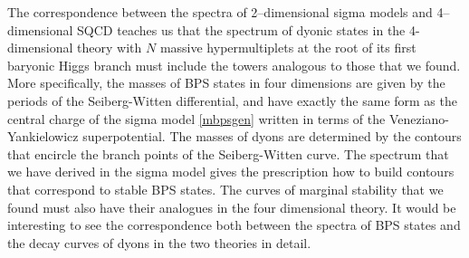 \documentclass[epsfig,12pt]{article}
\begin{document}
	The correspondence between the spectra of 2--dimensional sigma models and 4--dimensional SQCD
	teaches us that the spectrum of dyonic states in the 4-dimensional theory with $ N $ massive  
	hypermultiplets at the root of its first baryonic Higgs branch must include the towers analogous 
	to those that we found. 
	More specifically, the masses of BPS states in four dimensions are given by the periods of the 
	Seiberg-Witten differential, and have exactly the same form as the 
	central charge of the sigma model \eqref{mbpsgen} written in terms of the Veneziano-Yankielowicz superpotential.
	The masses of dyons are determined by the contours that encircle the branch points of the
	Seiberg-Witten curve.
	The spectrum that we have derived in the sigma model gives the prescription how to build 
	contours that correspond to stable BPS states.
	The curves of marginal stability that we found must also have their analogues in the four dimensional
	theory.
	It would be interesting to see the correspondence both between the spectra of BPS states and 
	the decay curves of dyons in the two theories in detail.
\end{document}
